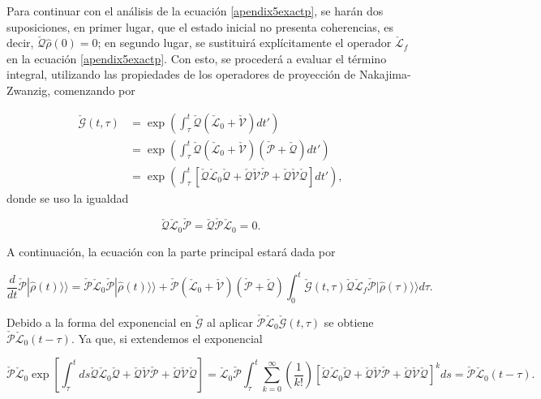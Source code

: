 \begin{appendixs}
Para continuar con el análisis de la ecuación \ref{apendix5exactp}, se harán dos suposiciones, en primer lugar, que el estado inicial no presenta coherencias, es decir, $\check{\mathcal{Q}}\hat{\rho}(0) = 0$; en segundo lugar, se sustituirá explícitamente el operador $\check{\mathcal{L}}_f$ en la ecuación \ref{apendix5exactp}. Con esto, se procederá a evaluar el término integral, utilizando las propiedades de los operadores de proyección de Nakajima-Zwanzig, comenzando por

\begin{align*}
    \check{\mathcal{G}}(t,\tau) & = \exp\left(  \int_{\tau}^{t}\check{\mathcal{Q}}(\check{\mathcal{L}}_{0} + \check{\mathcal{V}})dt' \right) \\
        & = \exp\left(  \int_{\tau}^{t}\check{\mathcal{Q}}(\check{\mathcal{L}}_{0}+\check{\mathcal{V}})(\check{\mathcal{P}}+\check{\mathcal{Q}}) dt' \right) \\
            & = \exp\left(  \int_{\tau}^{t}\left[\check{\mathcal{Q}}\check{\mathcal{L}}_{0}\check{\mathcal{Q}}+ \check{\mathcal{Q}}\check{\mathcal{V}}\check{\mathcal{P}}+\check{\mathcal{Q}}\check{\mathcal{V}}\check{\mathcal{Q}}\right] dt' \right),       
\end{align*}
donde se uso la igualdad

\begin{equation*}
    \check{\mathcal{Q}}\check{\mathcal{L}}_{0}\check{\mathcal{P}} = \check{\mathcal{Q}}\check{\mathcal{P}}\check{\mathcal{L}}_{0}= 0.
\end{equation*}

A continuación, la ecuación con la parte principal estará dada por 

\begin{equation*}
    \frac{d}{dt}\check{\mathcal{P}}|\hat{\rho}(t)\rangle \rangle = \check{\mathcal{P}}\check{\mathcal{L}}_{0}\check{\mathcal{P}}|\hat{\rho}(t)\rangle \rangle + \check{\mathcal{P}}(\check{\mathcal{L}}_{0} + \check{\mathcal{V}})(\check{\mathcal{P}}+\check{\mathcal{Q}})\int_{0}^{t}\check{\mathcal{G}}(t,\tau)\check{\mathcal{Q}}\check{\mathcal{L}}_{f} \check{\mathcal{P}}|\hat{\rho}(\tau)\rangle \rangle d\tau.       
\end{equation*}

Debido a la forma del exponencial en $\check{\mathcal{G}}$ al aplicar $\check{\mathcal{P}}\check{\mathcal{L}}_{0}\check{\mathcal{G}}(t,\tau)$ se obtiene $\check{\mathcal{P}}\check{\mathcal{L}}_{0}(t-\tau)$. Ya que, si extendemos el exponencial

\begin{equation*}
    \check{\mathcal{P}}\check{\mathcal{L}}_{0}\exp\left[\int_{\tau}^{t}ds\check{\mathcal{Q}}\check{\mathcal{L}}_{0}\check{\mathcal{Q}}+ \check{\mathcal{Q}}\check{\mathcal{V}}\check{\mathcal{P}}+\check{\mathcal{Q}}\check{\mathcal{V}}\check{\mathcal{Q}} \right] = \check{\mathcal{L}}_{0}\check{\mathcal{P}}\int_{\tau}^{t}\sum_{k=0}^{\infty}\left(\frac{1}{k!} \right)\left[\check{\mathcal{Q}}\check{\mathcal{L}}_{0}\check{\mathcal{Q}}+ \check{\mathcal{Q}}\check{\mathcal{V}}\check{\mathcal{P}}+\check{\mathcal{Q}}\check{\mathcal{V}}\check{\mathcal{Q}} \right]^{k}ds = \check{\mathcal{P}}\check{\mathcal{L}}_{0}(t-\tau).
\end{equation*}


\end{appendixs}
